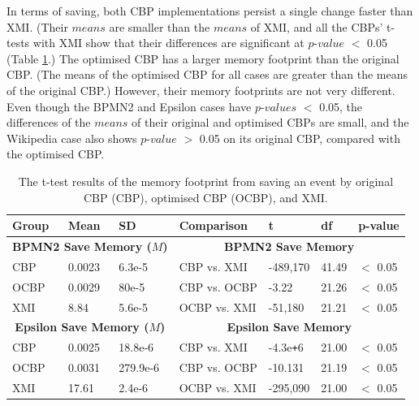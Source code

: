   In terms of saving, both CBP implementations persist a single change faster than XMI. (Their $means$ are smaller than the $means$ of XMI, and all the CBPs’ t-tests with XMI show that their differences are significant at $p$-$value$ $<$ 0.05 (Table \ref{table:ttest_results_save_memory}.) The optimised CBP has a larger memory footprint than the original CBP. (The means of the optimised CBP for all cases are greater than the means of the original CBP.) However, their memory footprints are not very different. Even though the BPMN2 and Epsilon cases have $p$-$values$ $<$ 0.05, the differences of the $means$ of their original and optimised CBPs are small, and the Wikipedia case also shows $p$-$value$ $>$ 0.05 on its original CBP, compared with the optimised CBP.
  
  \begin{table}[ht]
    \footnotesize
    \centering
    \caption{The t-test results of the memory footprint from saving an event by original CBP (CBP), optimised CBP (OCBP), and XMI.}
    \label{table:ttest_results_save_memory}
    \begin{tabular}
      {|p{}p{}p{}|p{}p{}p{}p{}|}
      \hline
      
      Group & Mean & SD & Comparison & t & df & p-value \\
      \hline
      \multicolumn{3}{|c|}{\textbf{BPMN2 Save Memory ($M$)}} & \multicolumn{4}{c|}{\textbf{BPMN2 Save Memory}} \\
      CBP &0.0023 & 6.3e-5 & CBP vs. XMI & -489,170 & 41.49 & $<$ 0.05 \\
      OCBP &0.0029 & 80e-5 & CBP vs. OCBP & -3.22 & 21.26 & $<$ 0.05 \\
      XMI & 8.84 & 5.6e-5 & OCBP vs. XMI & -51,180 & 21.21 & $<$ 0.05 \\
      \hline
      
      \multicolumn{3}{|c|}{\textbf{Epsilon Save Memory ($M$)}} & \multicolumn{4}{c|}{\textbf{Epsilon Save Memory}}\\
      CBP & 0.0025 & 18.8e-6 & CBP vs. XMI & -4.3e\texttt{+}6 & 21.00 & $<$ 0.05 \\
      OCBP & 0.0031 & 279.9e-6 & CBP vs. OCBP & -10.131 & 21.19 & $<$ 0.05 \\ %
      XMI & 17.61 & 2.4e-6 & OCBP vs. XMI & -295,090 &21.00 & $<$ 0.05 \\
      \hline
      

\end{tabular}
\end{table}
